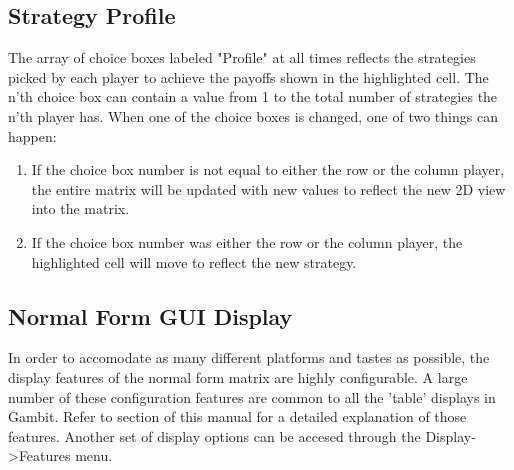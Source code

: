 \subsection{Strategy Profile}
The array of choice boxes labeled "Profile" at all times reflects the
strategies picked by each player to achieve the payoffs shown in the
highlighted cell.  The n'th choice box can contain a value from 1 to the
total number of strategies the n'th player has.  When one of the choice
boxes is changed, one of two things can happen:
\begin{enumerate}
\item If the choice box number is not equal to either the row or
the column player, the entire matrix will be updated with new values to
reflect the new 2D view into the matrix.
\item If the choice box number was either the row or the column player,
the highlighted cell will move to reflect the new strategy.
\end{enumerate}

\subsection{Normal Form GUI Display}
In order to accomodate as many different platforms and tastes as possible,
the display features of the normal form matrix are highly configurable.  A
large number of these configuration features are common to all the 'table'
displays in Gambit.  Refer to  section
of this manual for a detailed explanation of those features.  Another set
of display options can be accesed through the Display->Features menu.

